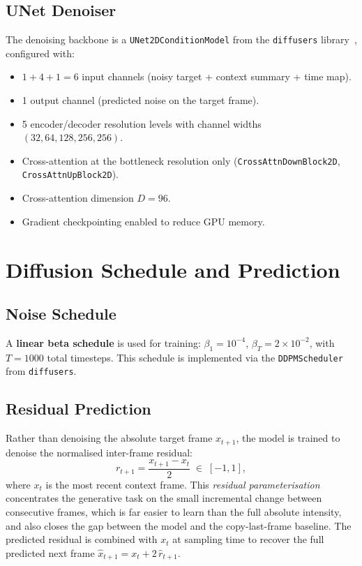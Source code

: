 \documentclass[12pt, a4paper, twoside]{report}
\begin{document}
\subsection{UNet Denoiser}
\label{ssec:unet}

The denoising backbone is a \texttt{UNet2DConditionModel} from the
\texttt{diffusers} library~\cite{von2022diffusers}, configured with:
\begin{itemize}
  \item $1{+}4{+}1 = 6$ input channels (noisy target + context summary + time map).
  \item 1 output channel (predicted noise on the target frame).
  \item 5 encoder/decoder resolution levels with channel widths
        $(32, 64, 128, 256, 256)$.
  \item Cross-attention at the bottleneck resolution only
        (\texttt{CrossAttnDownBlock2D}, \texttt{CrossAttnUpBlock2D}).
  \item Cross-attention dimension $D = 96$.
  \item Gradient checkpointing enabled to reduce GPU memory.
\end{itemize}

\section{Diffusion Schedule and Prediction}
\label{sec:schedules}

\subsection{Noise Schedule}
\label{ssec:noise_schedule}

A \textbf{linear beta schedule} is used for training:
$\beta_1 = 10^{-4}$, $\beta_T = 2 \times 10^{-2}$, with $T = 1000$ total
timesteps.
This schedule is implemented via the \texttt{DDPMScheduler} from
\texttt{diffusers}.

\subsection{Residual Prediction}
\label{ssec:residual}

Rather than denoising the absolute target frame $x_{t+1}$, the model is
trained to denoise the normalised inter-frame residual:
\[
  r_{t+1} = \frac{x_{t+1} - x_t}{2} \;\in\; [-1, 1],
\]
where $x_t$ is the most recent context frame.
This \emph{residual parameterisation} concentrates the generative task on the
small incremental change between consecutive frames, which is far easier to
learn than the full absolute intensity, and also closes the gap between the
model and the copy-last-frame baseline.
The predicted residual is combined with $x_t$ at sampling time to recover
the full predicted next frame $\hat{x}_{t+1} = x_t + 2\,\hat{r}_{t+1}$.
\end{document}
